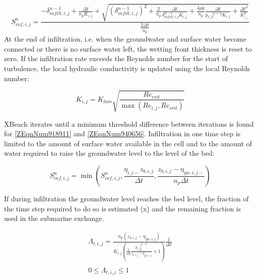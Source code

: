 \documentclass{article}
\begin{document}
\noindent 
\begin{equation} \label{ZEqnNum918911} 
S_{inf,i,j}^{n} =\frac{-\delta _{infill,i,j}^{n-1} +\frac{\Delta t}{n_{p} K_{i,j} } +\sqrt{\left(\delta _{infill,i,j}^{n-1} \right)^{2} +\frac{2}{n_{p} } \frac{\Delta t}{\delta _{infill,i,j}^{n-1} K_{i,j} } +\frac{4\rho g}{n_{p} } \frac{\Delta t}{p_{i,j} \left|^{z=\xi } \right. K_{i,j} } +\frac{\Delta t^{2} }{K_{_{i,j} }^{2} } } }{\frac{2\Delta t}{n_{p} } }  
\end{equation} 
At the end of infiltration, i.e. when the groundwater and surface water become connected or there is no surface water left, the wetting front thickness is reset to zero. If the infiltration rate exceeds the Reynolds number for the start of turbulence, the local hydraulic conductivity is updated using the local Reynolds number:

\noindent 
\begin{equation} \label{ZEqnNum940656} 
K_{i,j} =K_{lam} \sqrt{\frac{Re_{crit} }{\max (Re_{i,j} ,Re_{crit} )} }  
\end{equation} 


\noindent XBeach iterates until a minimum threshold difference between iterations is found for \eqref{ZEqnNum918911} and \eqref{ZEqnNum940656}. Infiltration in one time step is limited to the amount of surface water available in the cell and to the amount of water required to raise the groundwater level to the level of the bed:

\noindent 
\begin{equation} \label{6.11)} 
S_{inf,i,j}^{n} =\min \left(S_{inf,i,j}^{n} ,\frac{\eta _{i,j-} z_{b,i,j} }{\Delta t} ,\frac{z_{b,i,j} -\eta _{gw,i,j-} }{n_{p} \Delta t} \right) 
\end{equation} 


\noindent If during infiltration the groundwater level reaches the bed level, the fraction of the time step required to do so is estimated (x) and the remaining fraction is used in the submarine exchange.

\noindent 
\begin{equation} \label{6.11)} 
\begin{array}{c} {\Lambda _{t,i,j} =\frac{n_{p} \left(z_{b,i,j} -\eta _{gw,i,j} \right)}{K_{i,j} \left(\frac{1}{\rho g} \frac{\left. p_{i,j} \right|^{z=\xi } }{z_{b,i,j} -\eta _{gw,i,j} } +1\right)} \frac{1}{\Delta t} } \\ {} \\ {0\le \Lambda _{t,i,j} \le 1} \end{array} 
\end{equation} 
\end{document}
